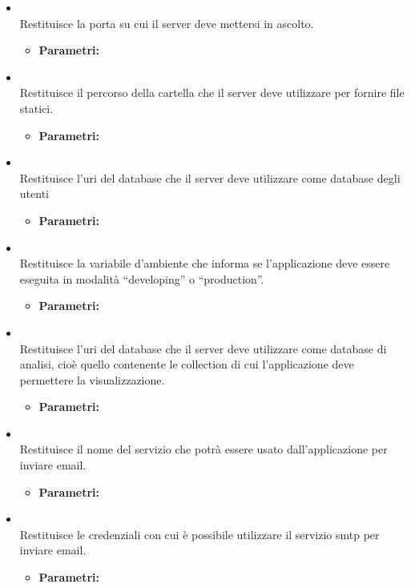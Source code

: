 \begin{itemize}
\item[] \textbf{} \\ Restituisce la porta su cui il server deve mettersi in ascolto.
\begin{itemize}\addtolength{\itemsep}{-0.5\baselineskip}
\item[] \textbf{Parametri:}
\end{itemize}
\item[] \textbf{} \\ Restituisce il percorso della cartella che il server deve utilizzare per fornire file statici.
\begin{itemize}\addtolength{\itemsep}{-0.5\baselineskip}
\item[] \textbf{Parametri:}
\end{itemize}
\item[] \textbf{} \\ Restituisce l'uri del database che il server deve utilizzare come database degli utenti
\begin{itemize}\addtolength{\itemsep}{-0.5\baselineskip}
\item[] \textbf{Parametri:}
\end{itemize}
\item[] \textbf{} \\ Restituisce la variabile d'ambiente che informa se l'applicazione deve essere eseguita in modalità ``developing'' o ``production''.
\begin{itemize}\addtolength{\itemsep}{-0.5\baselineskip}
\item[] \textbf{Parametri:}
\end{itemize}
\item[] \textbf{} \\ Restituisce l'uri del database che il server deve utilizzare come database di analisi, cioè quello contenente le collection di cui l'applicazione deve permettere la visualizzazione.
\begin{itemize}\addtolength{\itemsep}{-0.5\baselineskip}
\item[] \textbf{Parametri:}
\end{itemize}
\item[] \textbf{} \\ Restituisce il nome del servizio che potrà essere usato dall'applicazione per inviare email.
\begin{itemize}\addtolength{\itemsep}{-0.5\baselineskip}
\item[] \textbf{Parametri:}
\end{itemize}
\item[] \textbf{} \\ Restituisce le credenziali con cui è possibile utilizzare il servizio smtp per inviare email.
\begin{itemize}\addtolength{\itemsep}{-0.5\baselineskip}
\item[] \textbf{Parametri:}
\end{itemize}
\end{itemize}

